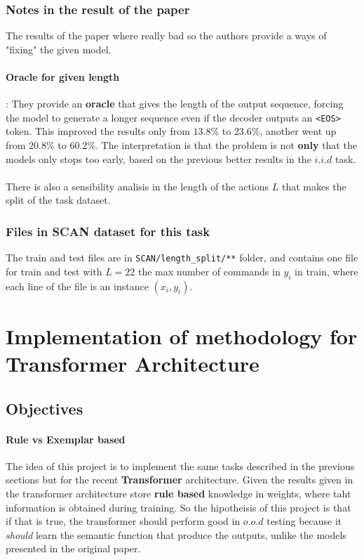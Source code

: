 \documentclass[]{article}
\begin{document}
\subsubsection*{Notes in the result of the paper}

The results of the paper where really bad so the authors provide a ways of "fixing" the given model.
\paragraph*{Oracle for given length}: They provide an \textbf{oracle} that gives the length of the output sequence, forcing the model to generate a longer sequence even if the decoder outputs an \texttt{<EOS>} token. This improved the results only from $13.8\%$ to $23.6\%$, another went up from $20.8\%$ to $60.2\%$. The interpretation is that the problem is not \textbf{only} that the models only stops too early, based on the previous better results in the $i.i.d$ task.

\paragraph*{}
There is also a sensibility analisis in the length of the actions $L$ that makes the split of the task dataset.

\subsubsection*{Files in SCAN dataset for this task}
The train and test files are in \texttt{SCAN/length\_split/**} folder, and contains one file for train and test with $L=22$ the max number of commands in $y_i$ in train, where each line of the file is an instance $(x_i, y_i)$.


\section{Implementation of methodology for Transformer Architecture}

\subsection*{Objectives}
\paragraph*{Rule vs Exemplar based}
The idea of this project is to implement the same tasks described in the previous sections but for the recent \textbf{Transformer} architecture. Given the results given in \cite{chan2022transformers} the transformer architecture store \textbf{rule based} knowledge in weights, where taht information is obtained during training. So the hipotheisis of this project is that if that is true, the transformer should perform good in $o.o.d$ testing because it \textit{should} learn the semantic function that produce the outputs, unlike the models presented in the original paper.
\end{document}
